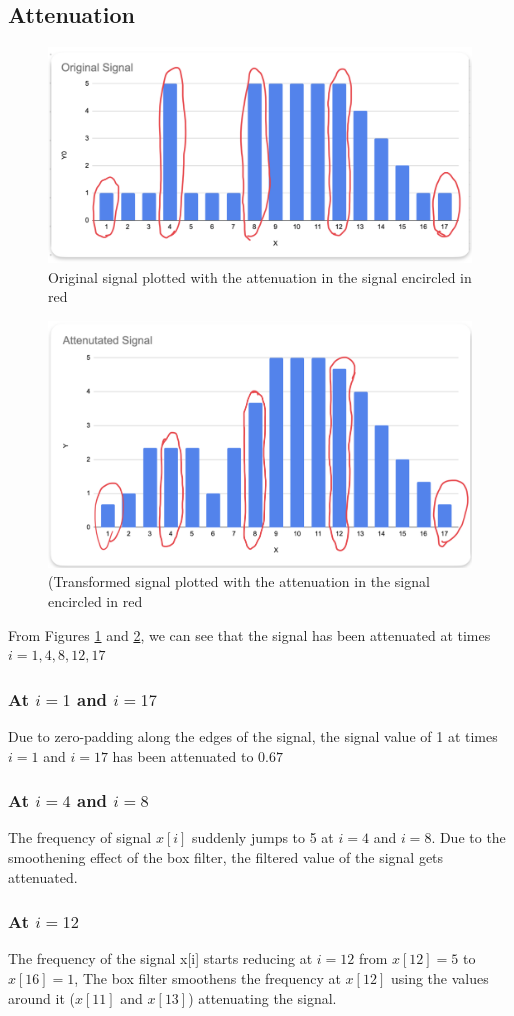\documentclass[a4paper,11pt]{article}
\begin{document}
\subsection{Attenuation}

\begin{figure}[H]
    \centering
    \includegraphics[width=0.5\linewidth]{figs/original_signal_graph.png}
    \caption{Original signal plotted with the attenuation in the signal encircled in red}
    \label{fig:og_signal}
\end{figure}
\begin{figure}[H]
    \centering
    \includegraphics[width=0.5\linewidth]{figs/attenuated_signal_graph.png}
    \caption{(Transformed signal plotted with the attenuation in the signal encircled in red}
    \label{fig:att_signal}
\end{figure}


From Figures \ref{fig:og_signal} and \ref{fig:att_signal}, we can see that the signal has been attenuated at times $i= 1,4,8,12,17$
\subsubsection{At $i=1$ and $i=17$}
Due to zero-padding along the edges of the signal, the signal value of 1 at times $i=1$ and $i=17$ has been attenuated to $0.67$

\subsubsection{At $i=4$ and $i=8$}
The frequency of signal $x[i]$ suddenly jumps to 5 at $i=4$ and $i=8$. Due to the smoothening effect of the box filter, the filtered value of the signal gets attenuated.

\subsubsection{At $i=12$}
The frequency of the signal x[i] starts reducing at $i=12$ from $x[12]=5$ to $x[16]=1$, The box filter smoothens the frequency at $x[12]$ using the values around it ($x[11]$ and $x[13]$) attenuating the signal.
\end{document}
